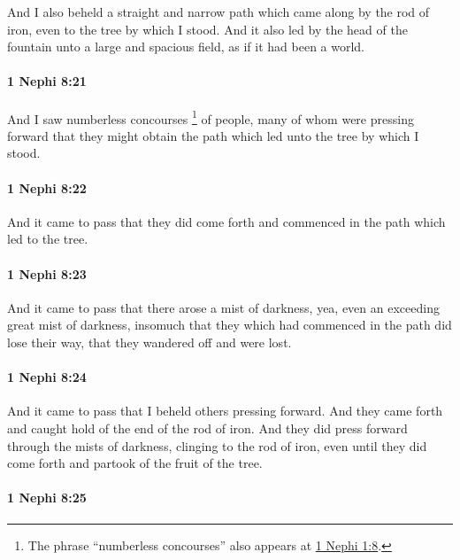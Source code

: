 			And I also beheld a straight and narrow path
			which came along by the rod of iron,
			even to the tree by which I stood.
			And it also led by the head of the fountain unto a large and spacious field,
			as if it had been a world.

		\paragraph{1 Nephi 8:21} %
			\label{1NEPHI-8-21}

			And I saw numberless concourses%
				\footnote{%
					The phrase ``numberless concourses'' also appears at \hyperref[1NEPHI-1-8]{1 Nephi 1:8}.
					}
			of people,
			many of whom were pressing forward
			that they might obtain the path
			which led unto the tree by which I stood.

		\paragraph{1 Nephi 8:22} %
			\label{1NEPHI-8-22}

			And it came to pass that they did come forth
			and commenced in the path which led to the tree.

		\paragraph{1 Nephi 8:23} %
			\label{1NEPHI-8-23}

			And it came to pass that there arose a mist of darkness,
			yea, even an exceeding great mist of darkness,
			insomuch that they which had commenced in the path did lose their way,
			that they wandered off and were lost.

		\paragraph{1 Nephi 8:24} %
			\label{1NEPHI-8-24}

			And it came to pass that I beheld others pressing forward.
			And they came forth and caught hold of the end of the rod of iron.
			And they did press forward through the mists of darkness,
			clinging to the rod of iron,
			even until they did come forth and partook of the fruit of the tree.

		\paragraph{1 Nephi 8:25} %
			\label{1NEPHI-8-25}

